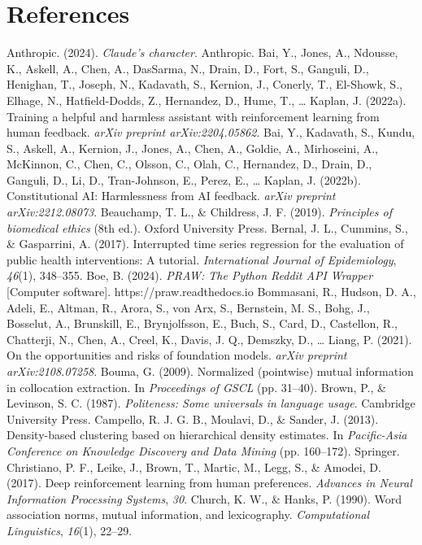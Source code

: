 \documentclass{obelus-preprint}
\begin{document}
\section{References}
Anthropic. (2024). \emph{Claude's character}. Anthropic.
Bai, Y., Jones, A., Ndousse, K., Askell, A., Chen, A., DasSarma, N., Drain, D., Fort, S., Ganguli, D., Henighan, T., Joseph, N., Kadavath, S., Kernion, J., Conerly, T., El-Showk, S., Elhage, N., Hatfield-Dodds, Z., Hernandez, D., Hume, T., \ldots{} Kaplan, J. (2022a). Training a helpful and harmless assistant with reinforcement learning from human feedback. \emph{arXiv preprint arXiv:2204.05862}.
Bai, Y., Kadavath, S., Kundu, S., Askell, A., Kernion, J., Jones, A., Chen, A., Goldie, A., Mirhoseini, A., McKinnon, C., Chen, C., Olsson, C., Olah, C., Hernandez, D., Drain, D., Ganguli, D., Li, D., Tran-Johnson, E., Perez, E., \ldots{} Kaplan, J. (2022b). Constitutional AI: Harmlessness from AI feedback. \emph{arXiv preprint arXiv:2212.08073}.
Beauchamp, T. L., \& Childress, J. F. (2019). \emph{Principles of biomedical ethics} (8th ed.). Oxford University Press.
Bernal, J. L., Cummins, S., \& Gasparrini, A. (2017). Interrupted time series regression for the evaluation of public health interventions: A tutorial. \emph{International Journal of Epidemiology}, \emph{46}(1), 348--355.
Boe, B. (2024). \emph{PRAW: The Python Reddit API Wrapper} [Computer software]. https://praw.readthedocs.io
Bommasani, R., Hudson, D. A., Adeli, E., Altman, R., Arora, S., von Arx, S., Bernstein, M. S., Bohg, J., Bosselut, A., Brunskill, E., Brynjolfsson, E., Buch, S., Card, D., Castellon, R., Chatterji, N., Chen, A., Creel, K., Davis, J. Q., Demszky, D., \ldots{} Liang, P. (2021). On the opportunities and risks of foundation models. \emph{arXiv preprint arXiv:2108.07258}.
Bouma, G. (2009). Normalized (pointwise) mutual information in collocation extraction. In \emph{Proceedings of GSCL} (pp. 31--40).
Brown, P., \& Levinson, S. C. (1987). \emph{Politeness: Some universals in language usage}. Cambridge University Press.
Campello, R. J. G. B., Moulavi, D., \& Sander, J. (2013). Density-based clustering based on hierarchical density estimates. In \emph{Pacific-Asia Conference on Knowledge Discovery and Data Mining} (pp. 160--172). Springer.
Christiano, P. F., Leike, J., Brown, T., Martic, M., Legg, S., \& Amodei, D. (2017). Deep reinforcement learning from human preferences. \emph{Advances in Neural Information Processing Systems}, \emph{30}.
Church, K. W., \& Hanks, P. (1990). Word association norms, mutual information, and lexicography. \emph{Computational Linguistics}, \emph{16}(1), 22--29.
\end{document}

